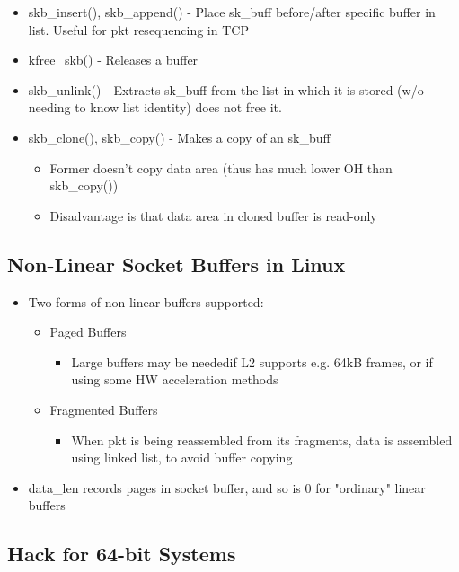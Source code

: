 \begin{itemize}
\begin{itemize}
		\item skb\_insert(), skb\_append() - Place sk\_buff before/after
			specific buffer in list. Useful for pkt resequencing in
			TCP
		\item kfree\_skb() - Releases a buffer
		\item skb\_unlink() - Extracts sk\_buff from the list in which
			it is stored (w/o needing to know list identity) does
			not free it.
		\item skb\_clone(), skb\_copy() - Makes a copy of an sk\_buff
		\begin{itemize}
			\item Former doesn't copy data area (thus has much lower
				OH than skb\_copy())
			\item Disadvantage is that data area in cloned buffer is
				read-only
		\end{itemize}
	\end{itemize}
\end{itemize}

\subsection{Non-Linear Socket Buffers in Linux}

\begin{itemize}
	\item Two forms of non-linear buffers supported:
	\begin{itemize}
		\item Paged Buffers
		\begin{itemize}
			\item Large buffers may be neededif L2 supports e.g.
				64kB frames, or if using some HW acceleration
				methods
		\end{itemize}
		\item Fragmented Buffers
		\begin{itemize}
			\item When pkt is being reassembled from its fragments,
				data is assembled using linked list, to avoid
				buffer copying
		\end{itemize}
	\end{itemize}
	\item data\_len records pages in socket buffer, and so is 0 for
		"ordinary" linear buffers
\end{itemize}

\subsection{Hack for 64-bit Systems}


